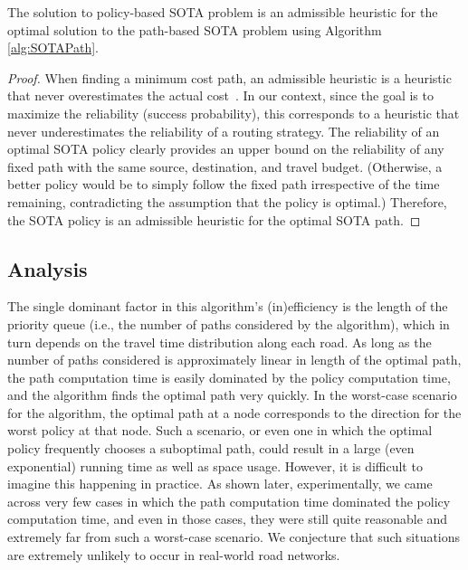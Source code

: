 \documentclass[oribibl]{llncs}
\begin{document}
			\begin{proposition}[Admissibility]
				The solution to policy-based SOTA problem is an admissible heuristic for the
				optimal solution to the path-based SOTA problem using Algorithm \ref{alg:SOTAPath}.
			\end{proposition}
			\begin{proof}
				When finding a minimum cost path, an admissible heuristic is a heuristic that
				never overestimates the actual cost~\cite{russell1995}.
				In our context, since the goal is to maximize the reliability (success probability),
				this corresponds to a heuristic that never underestimates the reliability of a
				routing strategy. The reliability of an optimal SOTA policy clearly provides an upper bound
				on the reliability of any fixed path with the same source, destination, and travel budget.
				(Otherwise, a better policy would be to simply follow the fixed path irrespective of
				the time remaining, contradicting the assumption that the policy is optimal.)
				Therefore, the SOTA policy is an admissible heuristic for the optimal SOTA path.
			\end{proof}


		\subsection{Analysis}

			The single dominant factor in this algorithm's (in)efficiency is the
			length of the priority queue (i.e., the number of paths considered by the algorithm),
			which in turn depends on the travel time distribution along each road.
			As long as the number of paths considered is approximately linear in length of the optimal path,
			the path computation time is easily dominated by the policy computation time, and the algorithm
			finds the optimal path very quickly.
			In the worst-case scenario for the algorithm, the optimal path at a node corresponds to the
			direction for the worst policy at that node.
			Such a scenario, or even one in which the optimal policy frequently chooses a suboptimal path,
			could result in a large (even exponential) running time as well as space usage.
			However, it is difficult to imagine this happening in practice.
			As shown later, experimentally, we came across very few cases in which the path
			computation time dominated the policy computation time, and even in those cases, they were
			still quite reasonable and extremely far from such a worst-case scenario.
			We conjecture that such situations are extremely unlikely to occur in real-world road networks.
\end{document}
